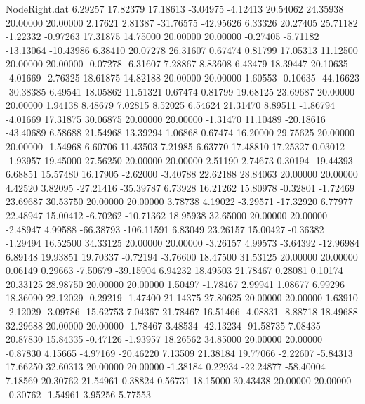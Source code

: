 \begin{filecontents}{NodeRight.dat}
   6.29257   17.82379   17.18613    -3.04975   -4.12413   20.54062   24.35938   20.00000   20.00000    2.17621    2.81387  -31.76575  -42.95626
   6.33326   20.27405   25.71182    -1.22332   -0.97263   17.31875   14.75000   20.00000   20.00000   -0.27405   -5.71182  -13.13064  -10.43986
   6.38410   20.07278   26.31607     0.67474    0.81799   17.05313   11.12500   20.00000   20.00000   -0.07278   -6.31607    7.28867    8.83608
   6.43479   18.39447   20.10635    -4.01669   -2.76325   18.61875   14.82188   20.00000   20.00000    1.60553   -0.10635  -44.16623  -30.38385
   6.49541   18.05862   11.51321     0.67474    0.81799   19.68125   23.69687   20.00000   20.00000    1.94138    8.48679    7.02815    8.52025
   6.54624   21.31470    8.89511    -1.86794   -4.01669   17.31875   30.06875   20.00000   20.00000   -1.31470   11.10489  -20.18616  -43.40689
   6.58688   21.54968   13.39294     1.06868    0.67474   16.20000   29.75625   20.00000   20.00000   -1.54968    6.60706   11.43503    7.21985
   6.63770   17.48810   17.25327     0.03012   -1.93957   19.45000   27.56250   20.00000   20.00000    2.51190    2.74673    0.30194  -19.44393
   6.68851   15.57480   16.17905    -2.62000   -3.40788   22.62188   28.84063   20.00000   20.00000    4.42520    3.82095  -27.21416  -35.39787
   6.73928   16.21262   15.80978    -0.32801   -1.72469   23.69687   30.53750   20.00000   20.00000    3.78738    4.19022   -3.29571  -17.32920
   6.77977   22.48947   15.00412    -6.70262  -10.71362   18.95938   32.65000   20.00000   20.00000   -2.48947    4.99588  -66.38793 -106.11591
   6.83049   23.26157   15.00427    -0.36382   -1.29494   16.52500   34.33125   20.00000   20.00000   -3.26157    4.99573   -3.64392  -12.96984
   6.89148   19.93851   19.70337    -0.72194   -3.76600   18.47500   31.53125   20.00000   20.00000    0.06149    0.29663   -7.50679  -39.15904
   6.94232   18.49503   21.78467     0.28081    0.10174   20.33125   28.98750   20.00000   20.00000    1.50497   -1.78467    2.99941    1.08677
   6.99296   18.36090   22.12029    -0.29219   -1.47400   21.14375   27.80625   20.00000   20.00000    1.63910   -2.12029   -3.09786  -15.62753
   7.04367   21.78467   16.51466    -4.08831   -8.88718   18.49688   32.29688   20.00000   20.00000   -1.78467    3.48534  -42.13234  -91.58735
   7.08435   20.87830   15.84335    -0.47126   -1.93957   18.26562   34.85000   20.00000   20.00000   -0.87830    4.15665   -4.97169  -20.46220
   7.13509   21.38184   19.77066    -2.22607   -5.84313   17.66250   32.60313   20.00000   20.00000   -1.38184    0.22934  -22.24877  -58.40004
   7.18569   20.30762   21.54961     0.38824    0.56731   18.15000   30.43438   20.00000   20.00000   -0.30762   -1.54961    3.95256    5.77553

\end{filecontents}
